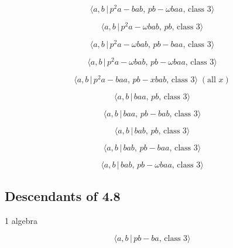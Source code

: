 \documentclass[10pt]{article}
\begin{document}
\begin{equation}
\langle a,b\,|\,p^2a-bab,\,pb-\omega baa,\,\text{class }3\rangle  \tag{6.374}
\end{equation}

\begin{equation}
\langle a,b\,|\,p^2a-\omega bab,\,pb,\,\text{class }3\rangle  \tag{6.375}
\end{equation}

\begin{equation}
\langle a,b\,|\,p^2a-\omega bab,\,pb-baa,\,\text{class }3\rangle  \tag{6.376}
\end{equation}

\begin{equation}
\langle a,b\,|\,p^2a-\omega bab,\,pb-\omega baa,\,\text{class }3\rangle 
\tag{6.377}
\end{equation}

\begin{equation}
\langle a,b\,|\,p^2a-baa,\,pb-xbab,\,\text{class }3\rangle\;(\text{all }x) 
\tag{6.378}
\end{equation}

\begin{equation}
\langle a,b\,|\,baa,\,pb,\,\text{class }3\rangle  \tag{6.379}
\end{equation}

\begin{equation}
\langle a,b\,|\,baa,\,pb-bab,\,\text{class }3\rangle  \tag{6.380}
\end{equation}

\begin{equation}
\langle a,b\,|\,bab,\,pb,\,\text{class }3\rangle  \tag{6.381}
\end{equation}

\begin{equation}
\langle a,b\,|\,bab,\,pb-baa,\,\text{class }3\rangle  \tag{6.382}
\end{equation}

\begin{equation}
\langle a,b\,|\,bab,\,pb-\omega baa,\,\text{class }3\rangle  \tag{6.383}
\end{equation}

\subsection{Descendants of 4.8}

1 algebra

\begin{equation}
\langle a,b\,|\,pb-ba,\,\text{class }3\rangle  \tag{6.384}
\end{equation}
\end{document}
